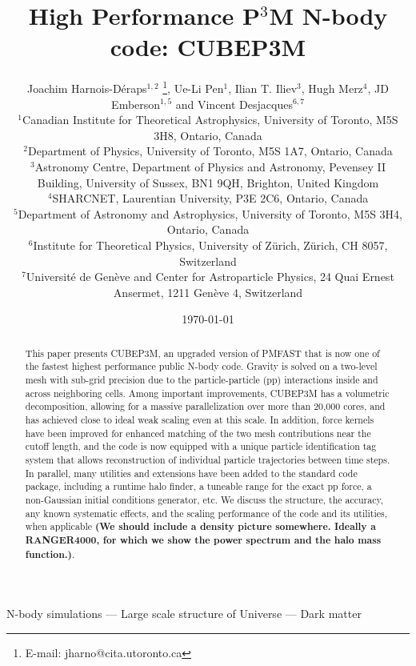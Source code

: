 \documentclass[useAMS,usenatbib]{mn2e}
\title[{\small}  High Performance P$^{3}$M N-body code: CUBEP3M]{{\small} High Performance P$^{3}$M N-body code: CUBEP3M}
\author[Joachim Harnois-D\'{e}raps, Ue-Li Pen, Ilian T. Iliev, Hugh Merz, JD Emberson, Vincent Desjacques]{Joachim Harnois-D\'{e}raps$^{1,2}$ 
\thanks{E-mail: jharno@cita.utoronto.ca},  Ue-Li Pen$^{1}$, 
Ilian T. Iliev$^{3}$, Hugh Merz$^{4}$, \newauthor
JD Emberson$^{1,5}$ and Vincent Desjacques$^{6,7}$\\
$^{1}$Canadian Institute for Theoretical Astrophysics, University of
Toronto, M5S 3H8, Ontario, Canada\\
$^{2}$Department of Physics, University of Toronto, M5S 1A7, Ontario,  Canada\\
$^{3}$Astronomy Centre, Department of Physics and Astronomy, Pevensey II Building, University of Sussex, BN1 9QH, Brighton, United Kingdom\\
$^{4}$SHARCNET, Laurentian University, P3E 2C6, Ontario, Canada\\
$^{5}$Department of Astronomy and Astrophysics, University of Toronto, M5S 3H4, Ontario, Canada\\
$^{6}$Institute for Theoretical Physics, University of Z\"{u}rich, Z\"{u}rich, CH 8057, Switzerland\\
$^{7}$Universit\'{e} de Gen\`{e}ve and Center for Astroparticle Physics, 24 Quai Ernest Ansermet, 1211 Gen\`{e}ve 4, Switzerland}
\begin{document}
\date{\today}

\pagerange{\pageref{firstpage}--\pageref{lastpage}} 

\maketitle

\label{firstpage}

\begin{abstract}
This paper presents {\small CUBEP3M}, an upgraded version of {\small PMFAST} that
is now one of the fastest highest performance public N-body code. 
Gravity is solved  on a two-level mesh with sub-grid precision due to the particle-particle (pp)
interactions inside and across neighboring cells.
Among important improvements,  {\small CUBEP3M} has a volumetric decomposition,
allowing for a massive parallelization over more than 20,000 cores, and has achieved close to ideal weak scaling
even at this scale.  In addition, force kernels have been improved for enhanced matching of the two mesh contributions near the cutoff length, and the code is now equipped with a unique particle identification tag system that allows reconstruction of individual particle trajectories between time steps.
In parallel, many utilities and extensions have been added to the standard code package, 
including a runtime halo finder, a tuneable range for the exact pp force, a non-Gaussian initial conditions generator, etc.
We discuss the structure, the accuracy, any known systematic effects, and the scaling performance
of the code and its utilities, when applicable {\bf (We should include a density picture somewhere. Ideally a RANGER4000, for which we show the
power spectrum and the halo mass function.)}.
\end{abstract}

\begin{keywords}
N-body simulations --- Large scale structure of Universe --- Dark matter
\end{keywords}









%

{}
%

\bsp

\label{lastpage}
\end{document}
